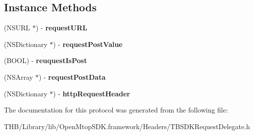 \subsection*{Instance Methods}
\begin{DoxyCompactItemize}
\item 
\mbox{\label{protocol_t_b_s_d_k_request_data_source_01-p_a5dc3a70e0fc59459bf238a5189ba4422}} 
(N\+S\+U\+RL $\ast$) -\/ {\bfseries request\+U\+RL}
\item 
\mbox{\label{protocol_t_b_s_d_k_request_data_source_01-p_af95bd330c28751f84f554fd3b3973fac}} 
(N\+S\+Dictionary $\ast$) -\/ {\bfseries request\+Post\+Value}
\item 
\mbox{\label{protocol_t_b_s_d_k_request_data_source_01-p_ad5cbdd126b668f7c183d6da10faae797}} 
(B\+O\+OL) -\/ {\bfseries reuquest\+Is\+Post}
\item 
\mbox{\label{protocol_t_b_s_d_k_request_data_source_01-p_a5865dd419e3adae42407d742fc9a092b}} 
(N\+S\+Array $\ast$) -\/ {\bfseries request\+Post\+Data}
\item 
\mbox{\label{protocol_t_b_s_d_k_request_data_source_01-p_ab6dbee1a1f99ec4d6c73118e1027cb18}} 
(N\+S\+Dictionary $\ast$) -\/ {\bfseries http\+Request\+Header}
\end{DoxyCompactItemize}


The documentation for this protocol was generated from the following file\+:\begin{DoxyCompactItemize}
\item 
T\+H\+B/\+Library/lib/\+Open\+Mtop\+S\+D\+K.\+framework/\+Headers/T\+B\+S\+D\+K\+Request\+Delegate.\+h\end{DoxyCompactItemize}
